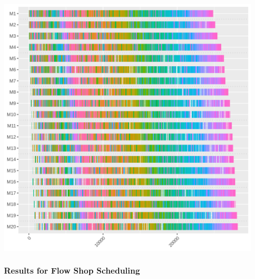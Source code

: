 \documentclass[12pt]{article}
\begin{document}
				\includegraphics[width=\linewidth]{20_500_GC_1.png}
				
			\subsubsection{Results for Flow Shop Scheduling}
			\clearpage
					
\end{document}
